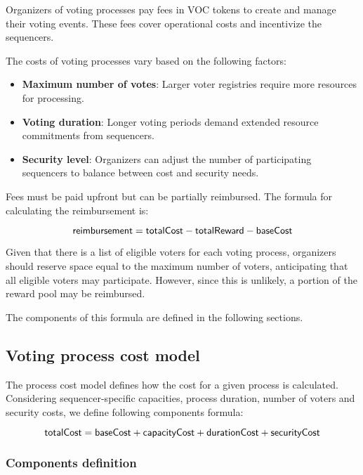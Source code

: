 Organizers of voting processes pay fees in VOC tokens to create and manage their voting events. These fees cover operational costs and incentivize the sequencers.

The costs of voting processes vary based on the following factors:

\begin{itemize}
	\item \textbf{Maximum number of votes}: Larger voter registries require more resources for processing.
	\item \textbf{Voting duration}: Longer voting periods demand extended resource commitments from sequencers.
	\item \textbf{Security level}: Organizers can adjust the number of participating sequencers to balance between cost and security needs.
\end{itemize}

Fees must be paid upfront but can be partially reimbursed. The formula for calculating the reimbursement is:

$$ {\sf{reimbursement}} = {\sf{totalCost}} - {\sf{totalReward}} - {\sf{baseCost}} $$

Given that there is a list of eligible voters for each voting process, organizers should reserve space equal to the maximum number of voters, anticipating that all eligible voters may participate. However, since this is unlikely, a portion of the reward pool may be reimbursed.

The components of this formula are defined in the following sections.

\subsection{Voting process cost model}

The process cost model defines how the cost for a given process is calculated.
Considering sequencer-specific capacities, process duration, number of voters and security costs, we define following components formula:

$$ {\sf{totalCost}} = {\sf{baseCost}} + {\sf{capacityCost}} + {\sf{durationCost}} + {\sf{securityCost}} $$

\subsubsection{Components definition}

